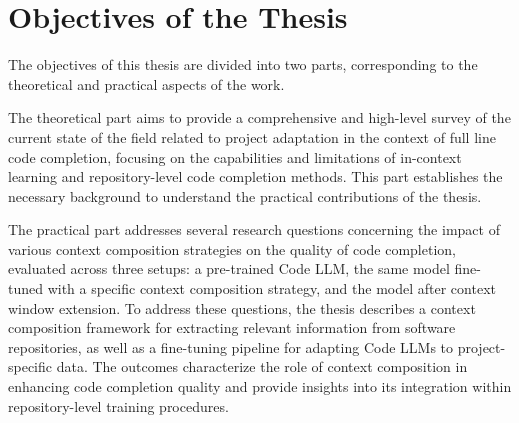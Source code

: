 \chapter*{Objectives of the Thesis}

The objectives of this thesis are divided into two parts, corresponding to the theoretical and practical aspects of the work.

The theoretical part aims to provide a comprehensive and high-level survey of the current state of the field related to project adaptation in the context of full line code completion, focusing on the capabilities and limitations of in-context learning and repository-level code completion methods. This part establishes the necessary background to understand the practical contributions of the thesis.

The practical part addresses several research questions concerning the impact of various context composition strategies on the quality of code completion, evaluated across three setups: a pre-trained Code LLM, the same model fine-tuned with a specific context composition strategy, and the model after context window extension. To address these questions, the thesis describes a context composition framework for extracting relevant information from software repositories, as well as a fine-tuning pipeline for adapting Code LLMs to project-specific data. The outcomes characterize the role of context composition in enhancing code completion quality and provide insights into its integration within repository-level training procedures.
